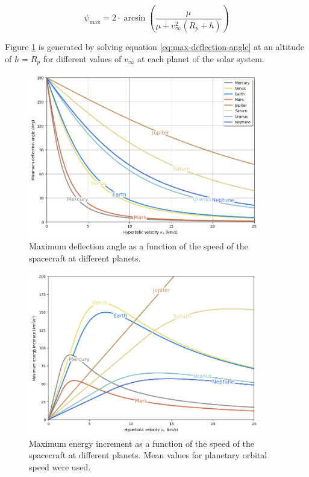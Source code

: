 \begin{equation}
        \psi_{\max} = 2 \cdot \arcsin{\left(\frac{\mu}{\mu + {v}^{2}_{\infty}(R_p + h)}\right)}
    \label{eq:max-deflection-angle}
\end{equation}

Figure \ref{fig:deflection-angle-at-speed} is generated by solving equation
\ref{eq:max-deflection-angle} at an altitude of $h = R_p$ for different values
of $v_{\infty}$ at each planet of the solar system.

\begin{figure}[H]
    \centering
    \includegraphics[width=0.9\textwidth]{fig/static/deflection_angle.png}
    \caption[Maximum deflection angle as a function of the speed of the spacecraft at different planets.]{Maximum deflection angle as a function of the speed of the spacecraft at different planets.}
    \label{fig:deflection-angle-at-speed}
\end{figure}

\begin{figure}[H]
    \centering
    \includegraphics[width=0.9\textwidth]{fig/static/max_energy.png}
    \caption[Maximum energy increment as a function of the speed of the
        spacecraft at different planets.]{Maximum energy increment as a function
        of the speed of the spacecraft at different planets. Mean values for
        planetary orbital speed were used.}
    \label{fig:max-energy-at-speed}
\end{figure}

